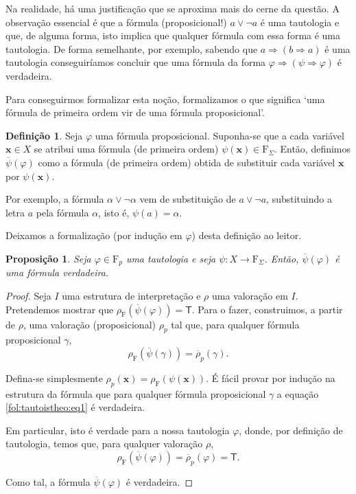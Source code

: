 \documentclass{report}
\newtheorem{prop}{Proposição}
\theoremstyle{definition}
\newtheorem{definicao}{Definição}
\theoremstyle{remark}
\renewcommand{\bf}[1]{\mathbf{#1}}
\newcommand{\F}{\mathrm{F}}
\newcommand{\lt}{\mathsf{T}}
\newcommand{\imply}{\mathbin{\Rightarrow}}
\begin{document}
	Na realidade, há uma justificação que se aproxima mais do cerne da questão. A observação essencial é que a fórmula (proposicional!) $a \lor \neg a$ é uma tautologia e que, de alguma forma, isto implica que qualquer fórmula com essa forma é uma tautologia. De forma semelhante, por exemplo, sabendo que $a \imply (b \imply a)$ é uma tautologia conseguiríamos concluir que uma fórmula da forma $\varphi \imply (\psi \imply \varphi)$ é verdadeira.
	
	Para conseguirmos formalizar esta noção, formalizamos o que significa `uma fórmula de primeira ordem vir de uma fórmula proposicional'.
	
	\begin{definicao}\label{formulasfromtauto}
	Seja $\varphi$ uma fórmula proposicional. Suponha-se que a cada variável $\bf x \in X$ se atribui uma fórmula (de primeira ordem) $\psi(\bf x) \in \F_\Sigma$. Então, definimos $\overline\psi(\varphi)$ como a fórmula (de primeira ordem) obtida de substituir cada variável $\bf x$ por $\psi(\bf x)$.
	
	Por exemplo, a fórmula $\alpha \lor \neg \alpha$ vem de substituição de $a \lor \neg a$, substituindo a letra $a$ pela fórmula $\alpha$, isto é, $\psi(a) = \alpha$.
	
	Deixamos a formalização (por indução em $\varphi$) desta definição ao leitor.
	\end{definicao}
	
	\begin{prop}\label{fol:tautoistheo}
	Seja $\varphi \in \F_p$ uma tautologia e seja $\psi : X \to \F_\Sigma$. Então, $\overline\psi(\varphi)$ é uma fórmula verdadeira.
	\end{prop}
	
	\begin{proof}
	Seja $I$ uma estrutura de interpretação e $\rho$ uma valoração em $I$. Pretendemos mostrar que $\rho_\F(\overline\psi(\varphi)) = \lt$. Para o fazer, construimos, a partir de $\rho$, uma valoração (proposicional) $\rho_p$ tal que, para qualquer fórmula proposicional $\gamma$,
	\begin{equation}\label{fol:tautoistheo:eq1}
	\rho_\F(\overline\psi(\gamma)) = \overline \rho_p (\gamma).
	\end{equation}
	
	Defina-se simplesmente $\rho_p(\bf x) = \rho_\F(\psi(\bf x))$. É fácil provar por indução na estrutura da fórmula que para qualquer fórmula proposicional $\gamma$ a equação \eqref{fol:tautoistheo:eq1} é verdadeira.
	
	Em particular, isto é verdade para a nossa tautologia $\varphi$, donde, por definição de tautologia, temos que, para qualquer valoração $\rho$,
	\[\rho_\F(\overline\psi(\varphi)) = \overline \rho_p (\varphi) = \lt.\]
	
	Como tal, a fórmula $\overline\psi(\varphi)$ é verdadeira.
	\end{proof}
	
\end{document}

